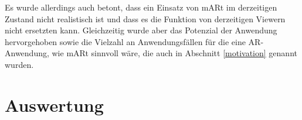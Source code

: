 Es wurde allerdings auch betont, dass ein Einsatz von mARt im derzeitigen Zustand nicht realistisch ist und dass es die Funktion von derzeitigen Viewern nicht ersetzten kann. Gleichzeitig wurde aber das Potenzial der Anwendung hervorgehoben sowie die Vielzahl an Anwendungsfällen für die eine AR-Anwendung, wie mARt sinnvoll wäre, die auch in Abschnitt \ref{motivation} genannt wurden. 

\section{Auswertung}
